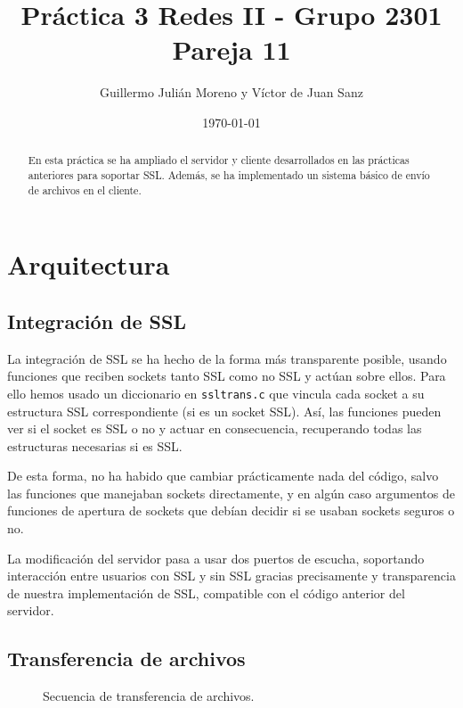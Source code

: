 \documentclass{article}
\title{Práctica 3 Redes II - Grupo 2301 Pareja 11}
\author{Guillermo Julián Moreno y Víctor de Juan Sanz}
\date{\today}
\begin{document}
\maketitle

\begin{abstract}
En esta práctica se ha ampliado el servidor y cliente desarrollados en las prácticas anteriores para soportar SSL. Además, se ha implementado un sistema básico de envío de archivos en el cliente.
\end{abstract}

\section{Arquitectura}

\subsection{Integración de SSL}

La integración de SSL se ha hecho de la forma más transparente posible, usando funciones que reciben sockets tanto SSL como no SSL y actúan sobre ellos. Para ello hemos usado un diccionario en \texttt{ssltrans.c} que vincula cada socket a su estructura SSL correspondiente (si es un socket SSL). Así, las funciones pueden ver si el socket es SSL o no y actuar en consecuencia, recuperando todas las estructuras necesarias si es SSL.

De esta forma, no ha habido que cambiar prácticamente nada del código, salvo las funciones que manejaban sockets directamente, y en algún caso argumentos de funciones de apertura de sockets que debían decidir si se usaban sockets seguros o no.

La modificación del servidor pasa a usar dos puertos de escucha, soportando interacción entre usuarios con SSL y sin SSL gracias precisamente y transparencia de nuestra implementación de SSL, compatible con el código anterior del servidor.

\subsection{Transferencia de archivos}

\begin{figure}
  \centering

  \begin{sequencediagram}


  \end{sequencediagram}

  \caption{Secuencia de transferencia de archivos.}
  \label{figSeq}
\end{figure}
\end{document}
